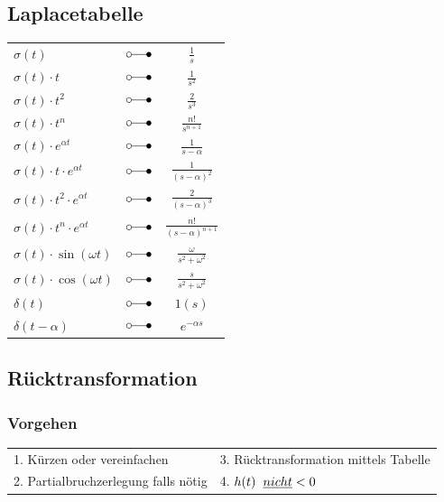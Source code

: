 	\subsection{Laplacetabelle}
	\begin{center}
		\begin{tabular}{|lcc|}
		\hline
			$\sigma \left( t \right)$ & $\laplace$ & $\frac{1}{s}$ \\
			$\sigma \left( t \right) \cdot t$ & $\laplace$ & $\frac{1}{s^2}$\\
			$\sigma \left( t \right) \cdot t^2$ & $\laplace$ & $\frac{2}{s^3}$\\
			$\sigma \left( t \right) \cdot t^n$ & $\laplace$ & $\frac{n!}{s^{n+1}}$\\
			$\sigma \left( t \right) \cdot e^{\alpha t}$ & $\laplace$ &
			$\frac{1}{s-\alpha}$\\
			$\sigma \left( t \right) \cdot t \cdot e^{\alpha t}$ & $\laplace$ &
			$\frac{1}{( s - \alpha )^2}$\\
			$\sigma \left( t \right)\cdot t^2 \cdot e^{\alpha t}$ &
			$\laplace$ & $\frac{2}{{( s - \alpha )}^3}$\\
			$\sigma \left( t \right)\cdot t^n \cdot e^{ \alpha t}$ &
			$\laplace$ & $\frac{n!}{(s-\alpha)^{n+1}}$\\
			$\sigma \left( t \right) \cdot \sin \left(\omega t \right)$ & $\laplace$ &
			$\frac{\omega}{s^2 + {\omega^2}}$\\
			$\sigma \left( t \right) \cdot \cos \left( \omega t \right)$ & $\laplace$ &
			$\frac{s}{ s^2 + \omega^2}$\\
			$\delta \left( t \right)$ & $\laplace$ & $1\left( s \right)$ \\
			$\delta \left( t - \alpha \right)$ & $\laplace$ & $e^{- \alpha s}$\\
		\hline
		\end{tabular}
	\end{center}
		
	\subsection{Rücktransformation}
		\subsubsection{Vorgehen}
			\begin{tabular}{p{6cm}p{6cm}}
				1. Kürzen oder vereinfachen &
				3. Rücktransformation mittels Tabelle \\
				2. Partialbruchzerlegung falls nötig &
				4. $h(t)\hspace{0.2cm}\underline{nicht} < 0$ \\
			\end{tabular}
	
